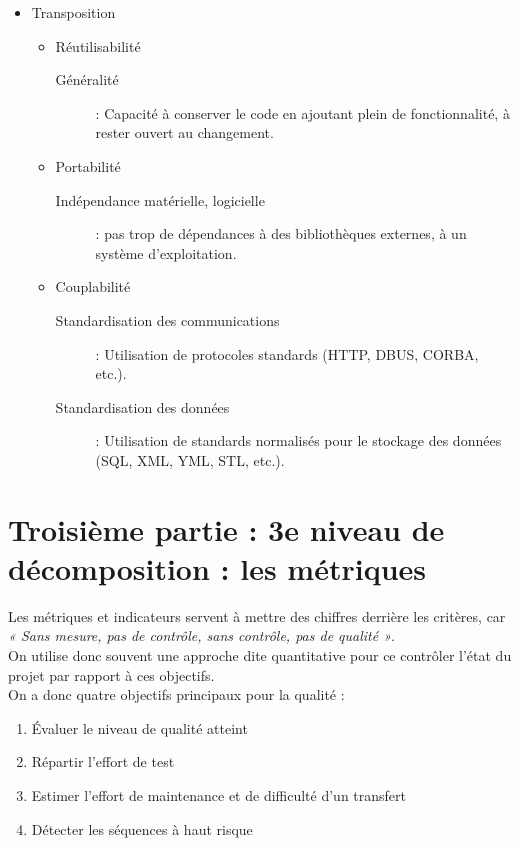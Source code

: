 \begin{itemize}
\item Transposition
	\begin{itemize}

	\item Réutilisabilité
		\begin{description}	
		\item[Généralité] : Capacité à conserver le code en ajoutant plein de fonctionnalité, à rester ouvert au changement.
		\end{description}

	\item Portabilité	
		\begin{description}	
		\item[Indépendance matérielle, logicielle] : pas trop de dépendances à des bibliothèques externes, à un système d'exploitation.
		\end{description}

	\item Couplabilité
		\begin{description}	
		\item[Standardisation des communications] : Utilisation de 	 protocoles standards (HTTP, DBUS, CORBA, etc.).
		\item[Standardisation des données] : Utilisation de standards normalisés pour le stockage des données (SQL, XML, YML, STL, etc.).
		\end{description}

	\end{itemize}

\end{itemize}


\section{Troisième partie : 3e niveau de décomposition : les métriques}

Les métriques et indicateurs servent à mettre des chiffres derrière les critères, car \textit{« Sans mesure, pas de contrôle, sans contrôle, pas de qualité »}.\\
On utilise donc souvent une approche dite quantitative pour ce contrôler l’état du projet par rapport à ces objectifs.\\ 
On a donc quatre objectifs principaux pour la qualité :
\begin{enumerate}
\item Évaluer le niveau de qualité atteint
\item Répartir l’effort de test
\item Estimer l’effort de maintenance et de difficulté d’un transfert
\item Détecter les séquences à haut risque
\end{enumerate}

